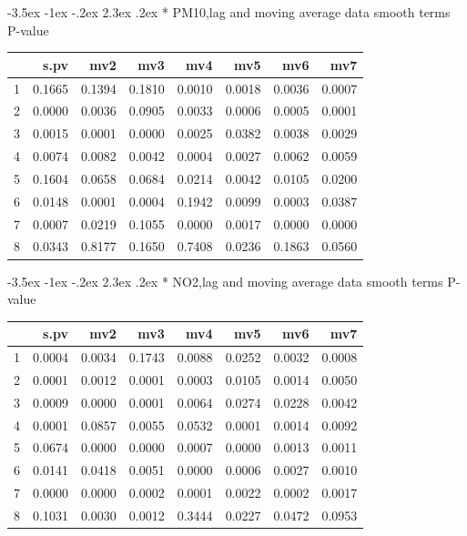 \documentclass[a4paper, 12pt]{article}
\makeatletter
\def\Large{\fontsize{16}{24}\selectfont}
\renewcommand\section{\@startsection {section}{1}{\z@}%
                                   {-3.5ex \@plus -1ex \@minus -.2ex}%
                                   {2.3ex \@plus.2ex}%
                                   {\centering\normalfont\Large\bfseries}}
\makeatother
\begin{document}
\section*{ PM10,lag and moving average data}
smooth terms P-value
\begin{table}[ht]
\centering
\begin{tabular}{rrrrrrrr}
  \hline
 & s.pv & mv2 & mv3 & mv4 & mv5 & mv6 & mv7 \\
  \hline
1 & 0.1665 & 0.1394 & 0.1810 & 0.0010 & 0.0018 & 0.0036 & 0.0007 \\
  2 & 0.0000 & 0.0036 & 0.0905 & 0.0033 & 0.0006 & 0.0005 & 0.0001 \\
  3 & 0.0015 & 0.0001 & 0.0000 & 0.0025 & 0.0382 & 0.0038 & 0.0029 \\
  4 & 0.0074 & 0.0082 & 0.0042 & 0.0004 & 0.0027 & 0.0062 & 0.0059 \\
  5 & 0.1604 & 0.0658 & 0.0684 & 0.0214 & 0.0042 & 0.0105 & 0.0200 \\
  6 & 0.0148 & 0.0001 & 0.0004 & 0.1942 & 0.0099 & 0.0003 & 0.0387 \\
  7 & 0.0007 & 0.0219 & 0.1055 & 0.0000 & 0.0017 & 0.0000 & 0.0000 \\
  8 & 0.0343 & 0.8177 & 0.1650 & 0.7408 & 0.0236 & 0.1863 & 0.0560 \\
   \hline
\end{tabular}
\end{table}
\clearpage
\section*{ NO2,lag and moving average data}
smooth terms P-value
\begin{table}[ht]
\centering
\begin{tabular}{rrrrrrrr}
  \hline
 & s.pv & mv2 & mv3 & mv4 & mv5 & mv6 & mv7 \\
  \hline
1 & 0.0004 & 0.0034 & 0.1743 & 0.0088 & 0.0252 & 0.0032 & 0.0008 \\
  2 & 0.0001 & 0.0012 & 0.0001 & 0.0003 & 0.0105 & 0.0014 & 0.0050 \\
  3 & 0.0009 & 0.0000 & 0.0001 & 0.0064 & 0.0274 & 0.0228 & 0.0042 \\
  4 & 0.0001 & 0.0857 & 0.0055 & 0.0532 & 0.0001 & 0.0014 & 0.0092 \\
  5 & 0.0674 & 0.0000 & 0.0000 & 0.0007 & 0.0000 & 0.0013 & 0.0011 \\
  6 & 0.0141 & 0.0418 & 0.0051 & 0.0000 & 0.0006 & 0.0027 & 0.0010 \\
  7 & 0.0000 & 0.0000 & 0.0002 & 0.0001 & 0.0022 & 0.0002 & 0.0017 \\
  8 & 0.1031 & 0.0030 & 0.0012 & 0.3444 & 0.0227 & 0.0472 & 0.0953 \\
   \hline
\end{tabular}
\end{table}
\clearpage
\end{document}
